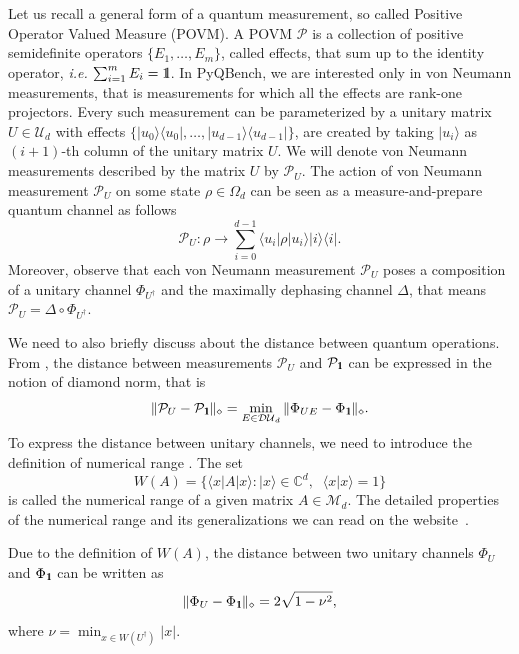 \documentclass[preprint,12pt, a4paper, dvipsnames]{elsarticle}
\newcommand{\ie}{{\emph{i.e.\/}}}
\newcommand{\ket}[1]{\ensuremath{|#1\rangle}}
\newcommand{\bra}[1]{\ensuremath{\langle#1|}}
\newcommand{\ketbra}[2]{\ensuremath{\ket{#1}\bra{#2}}}
\newcommand{\proj}[1]{\ensuremath{\ketbra{#1}{#1}}}
\newcommand{\braket}[2]{\ensuremath{\langle{#1}|{#2}\rangle}}
\newcommand{\1}{{\rm 1\hspace{-0.9mm}l}}
\newcommand{\Id}{{\rm 1\hspace{-0.9mm}l}}
\newcommand{\PP}{\mathcal{P}}
\newcommand{\diaguni}{\ensuremath{\mathcal{DU}}}
\theoremstyle{definition}
\begin{document}
Let us recall a  general form of a quantum measurement, so called Positive Operator Valued
Measure (POVM). A POVM $\PP$ is a collection of positive semidefinite operators $\{E_1, \ldots, E_m
\}$, called effects, that sum up to the identity operator, \ie $ \, \, \sum_{i=1}^m E_i = \1$.
In PyQBench, we are interested only in von Neumann measurements, that is measurements
for which all the effects are rank-one projectors. Every such measurement can be
parameterized by a unitary matrix $U \in \mathcal{U}_d$ with effects $\{\proj{u_0}, \ldots, \proj{u_{d-1}}\}$,
are created by taking $\ket{u_i}$ as  $(i+1)$-th column of the unitary matrix $U$.
We will denote von Neumann measurements described by the matrix $U$ by $\PP_{U}$.
The action of
von Neumann measurement $\PP_{U}$ on some state $\rho \in \Omega_d$ can be
seen as  a measure-and-prepare quantum channel as follows \begin{equation}
\PP_{U} : \rho \rightarrow \sum_{i=0}^{d-1} \bra{u_i} \rho \ket{u_i} \proj{i}.
\end{equation}
Moreover, observe that each von Neumann measurement $\PP_{U}$ poses a  composition of a unitary channel $\Phi_{U^\dagger}$ and the maximally dephasing channel $\Delta$, that means $\PP_{U} = \Delta \circ \Phi_{U^\dagger}$.

We need to also briefly discuss about the distance between quantum operations. From \cite[Theorem 1]{puchala2018strategies}, the distance between measurements $\PP_U$ and
$\PP_\Id$ can be expressed in the notion of diamond norm, that is
\begin{equation}
\|\PP_U - \PP_\Id\|_\diamond = \min_{E \in \diaguni_d} \|\Phi_{UE} -
\Phi_\Id\|_\diamond.
\end{equation} To express the distance between unitary channels, we need to introduce the definition of numerical range \cite{numericalrangle}. The set \begin{equation}
W(A) =\{\bra{x}A\ket{x}: \ket{x} \in
\mathbb{C}^d, \;
\;\braket{x}{x}=1\}
\end{equation}
is called the numerical range of  a given matrix $A \in \mathcal{M}_d$.
The detailed properties of the numerical range and its generalizations we can read on the website~\cite{nr}.

Due to the definition of $W(A)$, the distance between two unitary channels $\Phi_{U} $ and $\Phi_\Id$
can be written as
\begin{equation}
\| \Phi_U  - \Phi_{\1} \|_\diamond = 2 \sqrt{1-\nu^2},
\end{equation}
where $\nu = \min_{x \in W(U^\dagger)} |x|  $.
\end{document}
